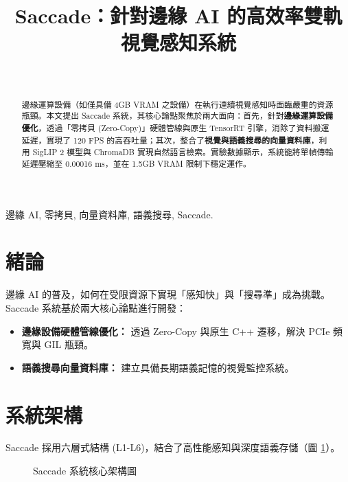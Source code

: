 \documentclass[journal, 10pt, twocolumn]{IEEEtran}
\begin{document}
\title{Saccade：針對邊緣 AI 的高效率雙軌視覺感知系統}

\author{
     \\
}

\maketitle

\begin{abstract}
邊緣運算設備（如僅具備 4GB VRAM 之設備）在執行連續視覺感知時面臨嚴重的資源瓶頸。本文提出 Saccade 系統，其核心論點聚焦於兩大面向：首先，針對\textbf{邊緣運算設備優化}，透過「零拷貝 (Zero-Copy)」硬體管線與原生 TensorRT 引擎，消除了資料搬運延遲，實現了 120 FPS 的高吞吐量；其次，整合了\textbf{視覺與語義搜尋的向量資料庫}，利用 SigLIP 2 模型與 ChromaDB 實現自然語言檢索。實驗數據顯示，系統能將單幀傳輸延遲壓縮至 0.00016 ms，並在 1.5GB VRAM 限制下穩定運作。
\end{abstract}

\begin{IEEEkeywords}
邊緣 AI, 零拷貝, 向量資料庫, 語義搜尋, Saccade.
\end{IEEEkeywords}

\section{緒論}
邊緣 AI 的普及，如何在受限資源下實現「感知快」與「搜尋準」成為挑戰。Saccade 系統基於兩大核心論點進行開發：
\begin{itemize}
    \item \textbf{邊緣設備硬體管線優化：} 透過 Zero-Copy 與原生 C++ 遷移，解決 PCIe 頻寬與 GIL 瓶頸。
    \item \textbf{語義搜尋向量資料庫：} 建立具備長期語義記憶的視覺監控系統。
\end{itemize}

\section{系統架構}
Saccade 採用六層式結構 (L1-L6)，結合了高性能感知與深度語義存儲（圖 \ref{fig:arch}）。

\begin{figure}[h]
\centering
{}
\caption{Saccade 系統核心架構圖}
\label{fig:arch}
\end{figure}
\end{document}
